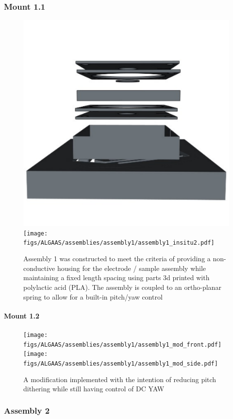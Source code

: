 \subsubsection*{Mount 1.1}
\begin{figure}[!ht]
	\begin{subcaptiongroup}
		\centering
		\includegraphics[width=.42\textwidth]{figs/ALGAAS/assemblies/assembly1/assembly1_dissassembled.pdf}
		\label{A1pt2CAD}
		\texttt{[image: figs/ALGAAS/assemblies/assembly1/assembly1\_insitu2.pdf]}
		\label{A1pt2pic}	
	\end{subcaptiongroup}
	\caption{Assembly 1 was constructed to meet the criteria of providing a non-conductive housing for the electrode / sample assembly while maintaining a fixed length spacing using parts 3d printed with polylactic acid (PLA). The assembly is coupled to an ortho-planar spring to allow for a built-in pitch/yaw control}
	\label{fig:assembly1bp}
\end{figure}
\FloatBarrier

\paragraph*{Mount 1.2}
\begin{figure}[!ht]
	\begin{subcaptiongroup}
		\texttt{[image: figs/ALGAAS/assemblies/assembly1/assembly1\_mod\_front.pdf]}
		\label{A1pt3CAD}
		\texttt{[image: figs/ALGAAS/assemblies/assembly1/assembly1\_mod\_side.pdf]}
		\label{A1pt3pic}
	\end{subcaptiongroup}
	\caption{A modification implemented with the intention of reducing pitch dithering while still having control of DC YAW}
	\label{fig:assembly1mod}
\end{figure}
\newpage

\subsubsection{Assembly 2}
